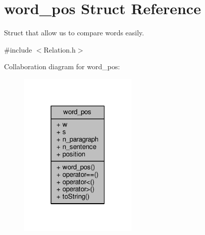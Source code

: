 \hypertarget{structword__pos}{}\section{word\+\_\+pos Struct Reference}
\label{structword__pos}


Struct that allow us to compare words easily.  




{\ttfamily \#include $<$Relation.\+h$>$}



Collaboration diagram for word\+\_\+pos\+:
\nopagebreak
\begin{figure}[H]
\begin{center}
\leavevmode
\includegraphics[width=159pt]{structword__pos__coll__graph}
\end{center}
\end{figure}
